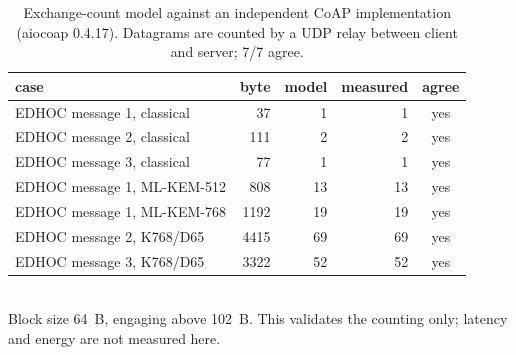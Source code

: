 \begin{table}[t]
\centering
\caption{Exchange-count model against an independent CoAP implementation (aiocoap 0.4.17). Datagrams are counted by a UDP relay between client and server; 7/7 agree.}
\label{tab:validation}
\footnotesize
\begin{tabular}{lrrrc}
\hline
case & byte & model & measured & agree \\
\hline
EDHOC message 1, classical & 37 & 1 & 1 & yes \\
EDHOC message 2, classical & 111 & 2 & 2 & yes \\
EDHOC message 3, classical & 77 & 1 & 1 & yes \\
EDHOC message 1, ML-KEM-512 & 808 & 13 & 13 & yes \\
EDHOC message 1, ML-KEM-768 & 1192 & 19 & 19 & yes \\
EDHOC message 2, K768/D65 & 4415 & 69 & 69 & yes \\
EDHOC message 3, K768/D65 & 3322 & 52 & 52 & yes \\
\hline
\end{tabular}
\\[2pt]{\footnotesize Block size 64~B, engaging above 102~B. This validates the counting only; latency and energy are not measured here.}
\end{table}
